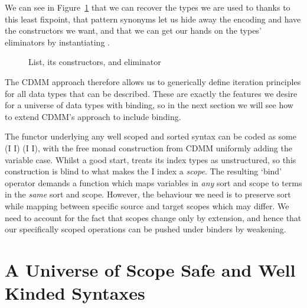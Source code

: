 We can see in Figure~\ref{fig:list} that we can recover the types we are
used to thanks to this least fixpoint, that pattern synonyms let us hide
away the encoding and have the constructors we want, and that we can get
our hands on the types' eliminators by instantiating .

\begin{figure}[h]
\begin{minipage}{0.45\textwidth}
\end{minipage}
\begin{minipage}{0.45\textwidth}
\end{minipage}
\caption{List, its constructors, and eliminator\label{fig:list}}
\end{figure}

The CDMM approach therefore allows us to generically define iteration principles
for all data types that can be described. These are exactly the features we desire
for a universe of data types with binding, so in the next section we will see how
to extend CDMM's approach to include binding.

The functor underlying any well scoped and sorted syntax can be coded as some
{ (I \AR{$\times$}  I) (I \AR{$\times$}  I)}, with the
free monad construction from CDMM uniformly adding the variable case. Whilst a
good start,  treats its index types as unstructured, so this construction
is blind to what makes the { I} index a \emph{scope}. The resulting
`bind' operator demands a function which maps variables in \emph{any} sort and
scope to terms in the \emph{same} sort and scope. However, the behaviour we need
is to preserve sort while mapping between specific source and target scopes which
may differ. We need to account for the fact that scopes change only by extension,
and hence that our specifically scoped operations can be pushed under binders by
weakening.




\section{A Universe of Scope Safe and Well Kinded Syntaxes}\label{section:universe}

